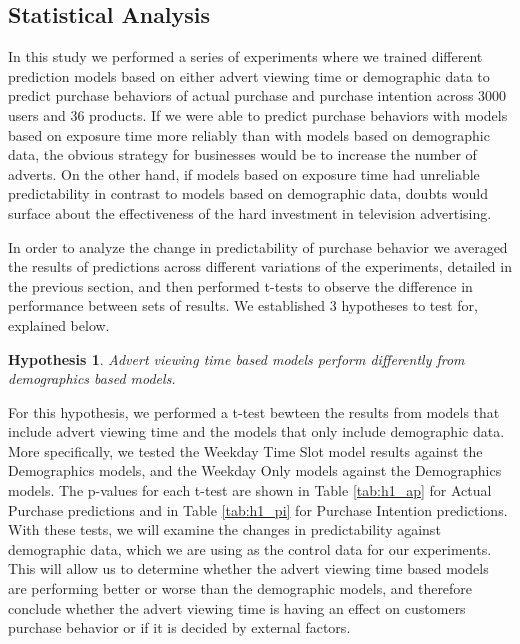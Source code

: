 \documentclass[review]{elsarticle}
\newtheorem{hyp}{Hypothesis}
\begin{document}
\subsection{Statistical Analysis}
\label{h_res}


In this study we performed a series of experiments where we trained different prediction models based on either advert viewing time or demographic data to predict purchase behaviors of actual purchase and purchase intention across 3000 users and 36 products. If we were able to predict purchase behaviors with models based on exposure time more reliably than with models based on demographic data, the obvious strategy for businesses would be to increase the number of adverts. On the other hand, if models based on exposure time had unreliable predictability in contrast to models based on demographic data, doubts would surface about the effectiveness of the hard investment in television advertising. 

In order to analyze the change in predictability of purchase behavior we averaged the results of predictions across different variations of the experiments, detailed in the previous section, and then performed t-tests to observe the difference in performance between sets of results. We established 3 hypotheses to test for, explained below.

\begin{hyp}
\label{hyp:1}
Advert viewing time based models perform differently from demographics based models.
\end{hyp}

For this hypothesis, we performed a t-test bewteen the results from models that include advert viewing time and the models that only include demographic data. More specifically, we tested the Weekday Time Slot model results against the Demographics models, and the Weekday Only models against the Demographics models. The p-values for each t-test are shown in Table \ref{tab:h1_ap} for Actual Purchase predictions and in Table \ref{tab:h1_pi} for Purchase Intention predictions. With these tests, we will examine the changes in predictability against demographic data, which we are using as the control data for our experiments. This will allow us to determine whether the advert viewing time based models are performing better or worse than the demographic models, and therefore conclude whether the advert viewing time is having an effect on customers purchase behavior or if it is decided by external factors.
\end{document}
